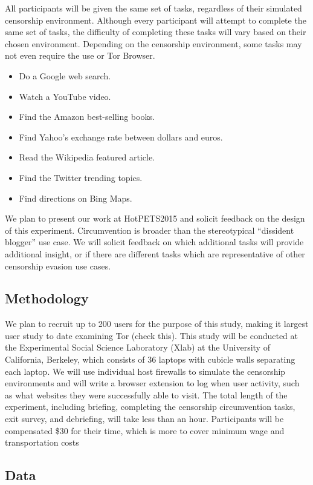 \documentclass[letterpaper,twocolumn,10pt]{article}
\begin{document}
All participants will be given the same set of tasks, regardless of their simulated
censorship environment.  Although every participant will attempt to complete the same 
set of tasks, the difficulty of completing these tasks will vary based on their chosen environment. 
Depending on the censorship environment, some tasks may not even require the use or Tor Browser. 

\begin{itemize} \itemsep1pt \parskip0pt 
\item Do a Google web search.
\item Watch a YouTube video.
\item Find the Amazon best-selling books.
\item Find Yahoo's exchange rate between dollars and euros.
\item Read the Wikipedia featured article.
\item Find the Twitter trending topics.
\item Find directions on Bing Maps.
\end{itemize}

We plan to present our work at HotPETS2015 and solicit feedback on the design
of this experiment. Circumvention is broader than the stereotypical ``dissident blogger'' 
use case. We will solicit feedback on which additional tasks will provide additional insight,
or if there are different tasks which are representative of other censorship evasion use cases.

\subsection{Methodology}  
We plan to recruit up to 200 users for the purpose of this study, 
making it largest user study to date examining Tor (check this). 
This study will be conducted at the Experimental Social Science Laboratory (Xlab)
at the University of California, Berkeley, which consists of 36 laptops with 
cubicle walls separating each laptop. We will use individual host firewalls to simulate
the censorship environments and will write a browser extension to 
log when user activity, such as what websites they were successfully able to visit. 
The total length of the experiment, including briefing, completing the censorship 
circumvention tasks, exit survey, and debriefing, will take less than an hour. 
Participants will be compensated \$30 for their time, 
which is more to cover minimum wage and transportation costs

\subsection{Data} 
\end{document}
